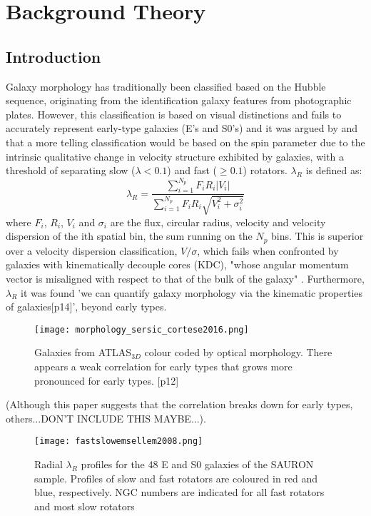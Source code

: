 
\chapter{Background Theory}

\label{ch:background}

\section{Introduction}
Galaxy morphology has traditionally been classified based on the Hubble sequence, originating from the identification galaxy features from photographic plates. However, this classification is based on visual distinctions and fails to accurately represent early-type galaxies (E's and S0's) and it was argued by \cite{Cappellari2011} and \cite{Emsellem2011} that a more telling classification would be based on the spin parameter due to the intrinsic qualitative change in velocity structure exhibited by galaxies, with a threshold of separating slow ($\lambda<0.1$) and fast ($\geq0.1$) rotators. $\lambda_{R}$ is defined as\cite{sauron9}:
\begin{equation}
\lambda_{R} = \frac{\sum_{i=1}^{N_{p}} F_{i}R_{i}|V_{i}|}{\sum_{i=1}^{N_{p}}F_{i}R_{i}\sqrt{V_{i}^2+\sigma_{i}^2}}
\end{equation}
where $F_i$, $R_i$, $V_i$ and $σ_i$ are the flux, circular radius, velocity and velocity dispersion of the ith spatial bin, the sum running on the $N_p$ bins.
This is superior over a velocity dispersion classification, $V/\sigma$, which fails when confronted by galaxies with kinematically decouple cores (KDC), "whose angular momentum vector is misaligned with respect to that of the bulk of the galaxy" \cite{mo_bosch_white_2010}. Furthermore, $\lambda_{R}$ it was found 'we can quantify galaxy morphology via the kinematic properties of galaxies\cite{Cortese2016}[p14]', beyond early types. 
\begin{figure}[h]
	\caption{Galaxies from ATLAS$_{3D}$ colour coded by optical morphology. There appears a weak correlation for early types that grows more pronounced for early types.	
		 \cite{Cortese2016}[p12]}
	\centering
	\texttt{[image: morphology\_sersic\_cortese2016.png]}
\end{figure}

(Although this paper suggests that the correlation breaks down for early types, others...DON'T INCLUDE THIS MAYBE...).  

\begin{figure}[h]
	\caption{Radial $\lambda_{R}$ profiles for the 48 E and S0 galaxies of the SAURON
	sample. Profiles of slow and fast rotators are coloured in red and blue, respectively.
	NGC numbers are indicated for all fast rotators and most slow
	rotators \cite[p.6]{Emsellem2011}}
	\centering
	\texttt{[image: fastslowemsellem2008.png]}
\end{figure}

